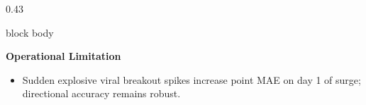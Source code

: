 \documentclass[aspectratio=169, 10pt]{beamer}
\newenvironment{card}[1][]{%
        \begin{beamercolorbox}[rounded=true,shadow=false,wd=\linewidth,sep=3.5pt,#1]{block body}%
        \fontsize{7.8pt}{9.8pt}\selectfont%
    }{%
        \end{beamercolorbox}%
    }
\begin{document}
\begin{frame}[t]
\begin{columns}[T]
            \begin{column}{0.43\textwidth}                                                                                                                                                             
                \begin{card}                                                                                                                                                                           
                    {\fontsize{7.5pt}{9pt}\selectfont \textbf{\color{CoralAccent}Operational Limitation}}\\[0.04cm]                                                                                    
                    \begin{itemize}\setlength{\itemsep}{1.5pt}                                                                                                                                         
                        \item Sudden explosive viral breakout spikes increase point MAE on day 1 of surge; directional accuracy remains robust.                                                        
                    \end{itemize}                                                                                                                                                                      
                \end{card}                                                                                                                                                                             
            \end{column}                                                                                                                                                                               
        \end{columns}                                                                                                                                                                                  
    \end{frame}                                                                                                                                                                                        
                                                                                                                                                                                                       
\end{document}
